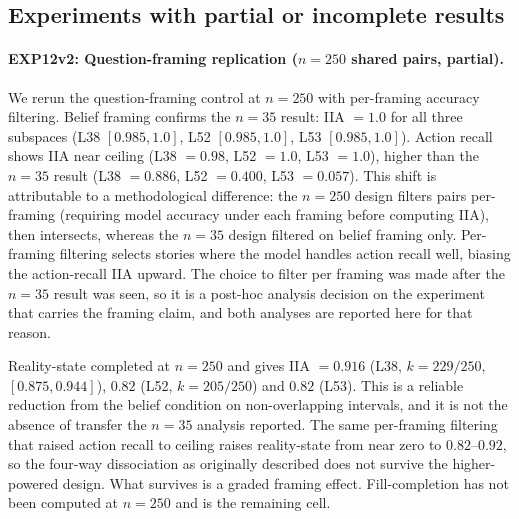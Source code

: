 \documentclass{article}
\begin{document}
\subsection{Experiments with partial or incomplete results}
\label{sec:partial}

\paragraph{EXP12v2: Question-framing replication ($n = 250$ shared pairs, partial).}
We rerun the question-framing control at $n = 250$ with per-framing accuracy filtering. Belief framing confirms the $n = 35$ result: IIA $= 1.0$ for all three subspaces (L38 $[0.985, 1.0]$, L52 $[0.985, 1.0]$, L53 $[0.985, 1.0]$). Action recall shows IIA near ceiling (L38 $= 0.98$, L52 $= 1.0$, L53 $= 1.0$), higher than the $n = 35$ result (L38 $= 0.886$, L52 $= 0.400$, L53 $= 0.057$). This shift is attributable to a methodological difference: the $n = 250$ design filters pairs per-framing (requiring model accuracy under each framing before computing IIA), then intersects, whereas the $n = 35$ design filtered on belief framing only. Per-framing filtering selects stories where the model handles action recall well, biasing the action-recall IIA upward. The choice to filter per framing was made after the $n = 35$ result was seen, so it is a post-hoc analysis decision on the experiment that carries the framing claim, and both analyses are reported here for that reason.

Reality-state completed at $n = 250$ and gives IIA $= 0.916$ (L38, $k = 229/250$, $[0.875, 0.944]$), $0.82$ (L52, $k = 205/250$) and $0.82$ (L53). This is a reliable reduction from the belief condition on non-overlapping intervals, and it is not the absence of transfer the $n = 35$ analysis reported. The same per-framing filtering that raised action recall to ceiling raises reality-state from near zero to $0.82$--$0.92$, so the four-way dissociation as originally described does not survive the higher-powered design. What survives is a graded framing effect. Fill-completion has not been computed at $n = 250$ and is the remaining cell.
\end{document}
